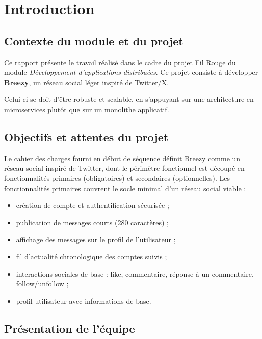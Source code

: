 \documentclass{cesi}
\begin{document}
\cesititlepage

\tableofcontents
\newpage

\section{Introduction}

\subsection{Contexte du module et du projet}

Ce rapport présente le travail réalisé dans le cadre du projet Fil Rouge du module
\emph{Développement d'applications distribuées}. Ce projet consiste à développer \textbf{Breezy},
un réseau social léger inspiré de Twitter/X.

Celui-ci se doit d'être robuste et scalable, en s'appuyant sur une architecture en
microservices plutôt que sur un monolithe applicatif.

\subsection{Objectifs et attentes du projet}

Le cahier des charges fourni en début de séquence définit Breezy comme un réseau
social inspiré de Twitter, dont le périmètre fonctionnel est découpé en
fonctionnalités primaires (obligatoires) et secondaires (optionnelles). Les
fonctionnalités primaires couvrent le socle minimal d'un réseau social viable :

\begin{itemize}
  \item création de compte et authentification sécurisée ;
  \item publication de messages courts (280 caractères) ;
  \item affichage des messages sur le profil de l'utilisateur ;
  \item fil d'actualité chronologique des comptes suivis ;
  \item interactions sociales de base : like, commentaire, réponse à un commentaire,
        follow/unfollow ;
  \item profil utilisateur avec informations de base.
\end{itemize}

\subsection{Présentation de l'équipe}
\end{document}
